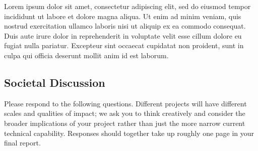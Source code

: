 \documentclass[10pt,twocolumn,letterpaper]{article}
\begin{document}
Lorem ipsum dolor sit amet, consectetur adipiscing elit, sed do eiusmod tempor incididunt ut labore et dolore magna aliqua. Ut enim ad minim veniam, quis nostrud exercitation ullamco laboris nisi ut aliquip ex ea commodo consequat. Duis aute irure dolor in reprehenderit in voluptate velit esse cillum dolore eu fugiat nulla pariatur. Excepteur sint occaecat cupidatat non proident, sunt in culpa qui officia deserunt mollit anim id est laborum.


\subsection{Societal Discussion}

Please respond to the following questions. Different projects will have different scales and qualities of impact; we ask you to think creatively and consider the broader implications of your project rather than just the more narrow current technical capability. Responses should together take up roughly one page in your final report.
\end{document}
